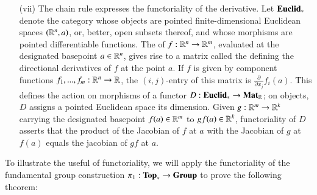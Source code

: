 \begin{example}
\begin{enumerate}
        \item[(vii)] The chain rule expresses the functoriality of the derivative. Let $\normalfont\textbf{Euclid}_*$ denote the category whose objects are pointed finite-dimensional Euclidean spaces $(\mathbb R^n,a)$, or, better, open subsets thereof, and whose morphisms are pointed differentiable functions. The  of $f:\mathbb R^n\rightarrow \mathbb R^m$, evaluated at the designated basepoint $a \in \mathbb R^n$, gives rise to a matrix called the  defining the directional derivatives of $f$ at the point $a$. If $f$ is given by component functions $f_1,...,f_m:\mathbb R^n\rightarrow \mathbb R$, the $(i,j)$-entry of this matrix is $\frac{\partial}{\partial x_j}f_i(a)$. This defines the action on morphisms of a functor $D:\normalfont\textbf{Euclid}_*\rightarrow \normalfont\textbf{Mat}_{\mathbb R}$; on objects, $D$ assigns a pointed Euclidean space its dimension. Given $g:\mathbb R^m\rightarrow \mathbb R^k$ carrying the designated basepoint $f(a) \in \mathbb R^m$ to $gf(a) \in \mathbb R^k$, functoriality of $D$ asserts that the product of the Jacobian of $f$ at $a$ with the Jacobian of $g$ at $f(a)$ equals the jacobian of $gf$ at $a$.
    \end{enumerate}
\end{example}

To illustrate the useful of functoriality, we will apply the functoriality of the fundamental group construction $\pi_1:\normalfont\textbf{Top}_*\rightarrow \normalfont\textbf{Group}$ to prove the following theorem: 


